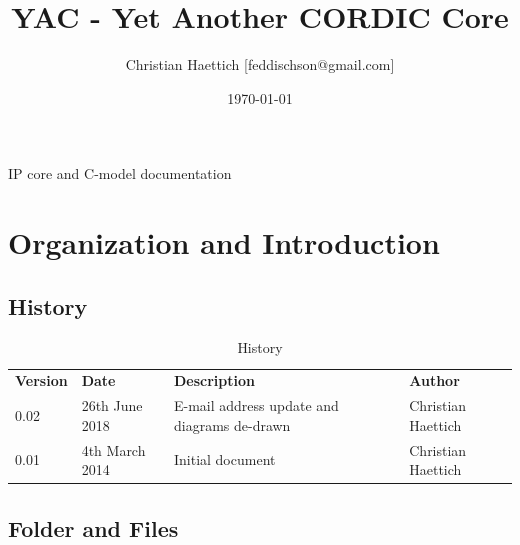 \documentclass[a4paper, 12pt, notitlepage]{report}
\title{YAC - Yet Another CORDIC Core}
\author{Christian Haettich [feddischson@gmail.com]}
\date{\today}
\begin{document}
\maketitle
\begin{center}
IP core and C-model documentation 
\end{center}
\thispagestyle{empty}

\tableofcontents 


\chapter{Organization and Introduction}
\section{History}
\begin{table}[htbp]
   \center
   \begin{tabular}{@{}llll@{}}
      \rowcolor{tableheadcolor}\textbf{Version}& \textbf{Date} & \textbf{Description} & \textbf{Author}  \\

      \multirow{1}{*}{0.02}  & 26th June 2018 & E-mail address update and diagrams de-drawn & Christian Haettich\\\midrule
      \multirow{1}{*}{0.01}  & 4th March 2014 & Initial document & Christian Haettich\\\midrule
      \bottomrule
   \end{tabular}
   \caption{History}
   \label{tab:frqband}
\end{table} 


\section{Folder and Files}
\end{document}

